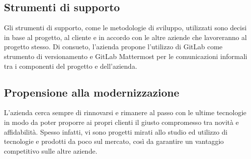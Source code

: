 \subsection{Strumenti di supporto}
Gli strumenti di supporto, come le metodologie di sviluppo, utilizzati sono decisi in base al progetto, al cliente e in accordo con le altre aziende che lavoreranno al progetto stesso.
Di consueto, l'azienda propone l'utilizzo di \gls{GitLab} come strumento di versionamento e \gls{GitLab Mattermost} per le comunicazioni informali tra i componenti del progetto e dell'azienda.
\subsection{Propensione alla modernizzazione}
L'azienda cerca sempre di rinnovarsi e rimanere al passo con le ultime tecnologie in modo da poter proporre ai propri clienti il giusto compromesso tra novità e affidabilità. Spesso infatti, vi sono progetti mirati allo studio ed utilizzo di tecnologie e prodotti da poco sul mercato, così da garantire un vantaggio competitivo sulle altre aziende.
